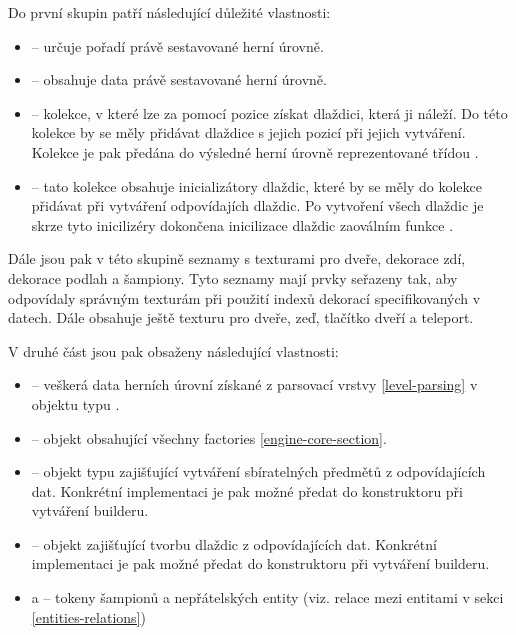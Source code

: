 Do první skupin patří následující důležité vlastnosti:
\begin{itemize}
\item {} -- určuje pořadí právě sestavované herní úrovně.
\item {} -- obsahuje data právě sestavované herní úrovně.
\item {} -- kolekce, v které lze za pomocí pozice získat dlaždici, která ji náleží.
	Do této kolekce by se měly přidávat dlaždice s jejich pozicí při jejich vytváření.
	Kolekce je pak předána do výsledné herní úrovně reprezentované třídou .

\item {} -- tato kolekce obsahuje inicializátory dlaždic, které by se měly 
	 do kolekce přidávat při vytváření odpovídajích dlaždic. Po vytvoření všech dlaždic je skrze tyto 
	 inicilizéry dokončena inicilizace dlaždic zaoválním funkce .
\end{itemize}
Dále jsou pak v této skupině seznamy s texturami pro dveře, dekorace zdí, dekorace podlah a šampiony. Tyto seznamy mají prvky seřazeny tak, aby odpovídaly 
správným texturám při použití indexů dekorací specifikovaných v datech. Dále obsahuje ještě texturu pro 
dveře, zeď, tlačítko dveří a teleport.

V druhé část jsou pak obsaženy následující vlastnosti:
\begin{itemize}
\item {} -- veškerá data herních úrovní získané z parsovací vrstvy \vref{level-parsing} v objektu typu .
\item {} -- objekt obsahující všechny factories \vref{engine-core-section}.
\item {} -- objekt typu  zajišťující vytváření sbíratelných předmětů z odpovídajících dat.
	Konkrétní implementaci je pak možné předat do konstruktoru při vytváření builderu.
\item {} -- objekt  zajišťující tvorbu dlaždic z odpovídajících dat.
	Konkrétní implementaci je pak možné předat do konstruktoru při vytváření builderu.
\item {} a  -- tokeny šampionů a nepřátelských entity (viz. relace mezi entitami v sekci \ref{entities-relations}) 
\end{itemize}

